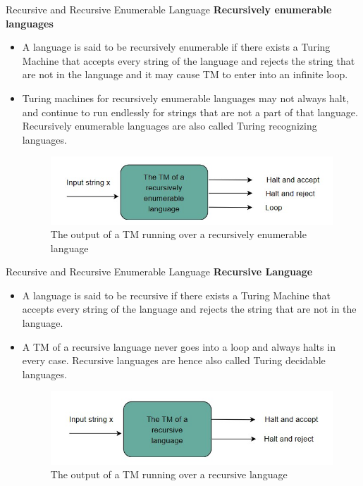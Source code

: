 \documentclass{beamer}
\begin{document}
\begin{frame}{Recursive and Recursive Enumerable Language}
	\textbf{Recursively enumerable languages}
	\begin{itemize}
		\item A language is said to be recursively enumerable
		if there exists a Turing Machine that accepts every
		string of the language and rejects the string that are not
		in the language and it may cause TM to enter into an
		infinite loop.
		\item Turing machines for recursively enumerable languages may not always halt, and continue to run endlessly for strings that are not a part of that language. Recursively enumerable languages are also called Turing recognizing languages.
	\begin{figure}
	\includegraphics[scale=.65]{img5/m28}
	\caption{The output of a TM running over a recursively enumerable language}
\end{figure}
	\end{itemize}
\end{frame}
\begin{frame}{Recursive and Recursive Enumerable Language}
	\textbf{Recursive Language}
	\begin{itemize}
		\item A language is said to be recursive if there 
		exists a Turing Machine that accepts every string 
		of the language and rejects the string that are 
		not in the language.
		\item A TM of a recursive language never goes into a loop and always halts in every case. Recursive languages are hence also called Turing decidable languages.
		\begin{figure}
			\includegraphics[scale=.65]{img5/m29}
			\caption{The output of a TM running over a recursive language}
		\end{figure}
	\end{itemize}
\end{frame}
\end{document}
